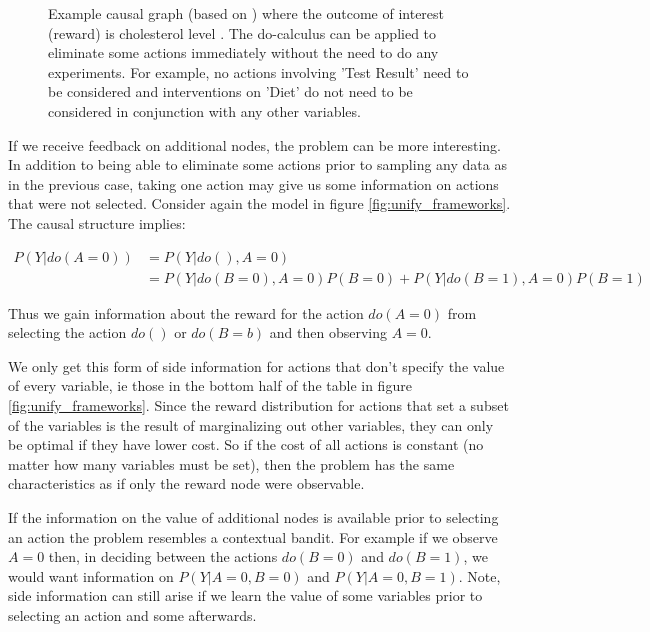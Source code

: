 \documentclass[11pt,a4paper]{article}
\newcommand{\eqn}[1]{\begin{align}#1\end{align}}
\begin{document}
\begin{figure}[h]
\caption{Example causal graph (based on \cite{Koller2009}) where the outcome of interest (reward) is cholesterol level . The do-calculus can be applied to eliminate some actions immediately without the need to do any experiments. For example, no actions involving 'Test Result' need to be considered and interventions on 'Diet' do not need to be considered in conjunction with any other variables.}
\label{fig:cholesterol_graph}
\centering
{}
\end{figure}

If we receive feedback on additional nodes, the problem can be more interesting. In addition to being able to eliminate some actions prior to sampling any data as in the previous case, taking one action may give us some information on actions that were not selected. Consider again the model in figure \ref{fig:unify_frameworks}. The causal structure implies: 

\eqn {
P(Y|do(A = 0)) &= P(Y|do(),A = 0) \\
&= P(Y|do(B=0),A=0)P(B=0)+P(Y|do(B=1),A=0)P(B=1) 
}

Thus we gain information about the reward for the action $do(A=0)$ from selecting the action $do()$ or $do(B = b)$ and then observing $A = 0$.  

We only get this form of side information for actions that don't specify the value of every variable, ie those in the bottom half of the table in figure \ref{fig:unify_frameworks}. Since the reward distribution for actions that set a subset of the variables is the result of marginalizing out other variables, they can only be optimal if they have lower cost. So if the cost of all actions is constant (no matter how many variables must be set), then the problem has the same characteristics as if only the reward node were observable.

If the information on the value of additional nodes is available prior to selecting an action the problem resembles a contextual bandit. For example if we observe $A = 0$ then, in deciding between the actions $do(B=0)$ and $do(B=1)$, we would want information on $P(Y|A=0,B=0)$ and $P(Y|A=0,B=1)$.  Note, side information can still arise if we learn the value of some variables prior to selecting an action and some afterwards. 
\end{document}
